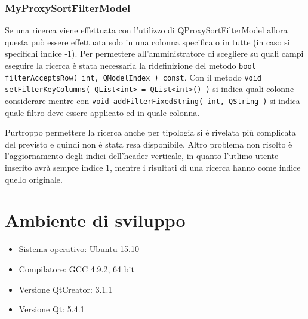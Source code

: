 \documentclass[a4paper,10pt]{article}
\begin{document}
\subsubsection*{MyProxySortFilterModel}
Se una ricerca viene effettuata con l'utilizzo di QProxySortFilterModel allora questa può essere effettuata solo in una colonna specifica o in tutte (in caso si specifichi indice -1). Per permettere all'amministratore di scegliere su quali campi eseguire la ricerca è stata necessaria la ridefinizione del metodo \texttt{bool filterAcceptsRow( int, QModelIndex ) const}. Con il metodo \texttt{void setFilterKeyColumns( QList<int> = QList<int>() )} si indica quali colonne considerare mentre con \texttt{void addFilterFixedString( int, QString )} si indica quale filtro deve essere applicato ed in quale colonna.

Purtroppo permettere la ricerca anche per tipologia si è rivelata più complicata del previsto e quindi non è stata resa disponibile. Altro problema non risolto è l'aggiornamento degli indici dell'header verticale, in quanto l'utlimo utente inserito avrà sempre indice 1, mentre i risultati di una ricerca hanno come indice quello originale.

\section*{Ambiente di sviluppo}
\begin{itemize}
	\item Sistema operativo: Ubuntu 15.10
	\item Compilatore: GCC 4.9.2, 64 bit
	\item Versione QtCreator: 3.1.1
	\item Versione Qt: 5.4.1
\end{itemize}
\end{document}
